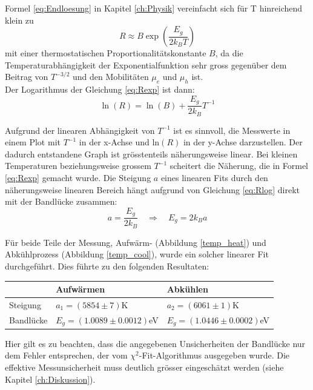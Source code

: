 \documentclass[a4paper,parskip,11pt, DIV12]{scrreprt}
\begin{document}
Formel \ref{eq:Endloesung} in Kapitel \ref{ch:Physik} vereinfacht sich für T hinreichend klein zu
\begin{equation}
\label{eq:Rexp}
R \approx B \exp \left(\frac{E_g}{2 k_B T}\right)
\end{equation}
mit einer thermostatischen Proportionalitätskonstante $B$, da die Temperaturabhängigkeit der Exponentialfunktion sehr gross gegenüber dem Beitrag von $T^{-3/2}$ und den Mobilitäten $\mu_e$ und $\mu_h$ ist.
\\
Der Logarithmus der Gleichung \ref{eq:Rexp} ist dann:
\begin{equation}
\label{eq:Rlog}
\ln(R) = \ln (B) + \frac{E_g}{2 k_B} T^{-1}
\end{equation}

Aufgrund der linearen Abhängigkeit von $T^{-1}$ ist es sinnvoll, die Messwerte in einem Plot mit $T^{-1}$ in der x-Achse und ln$(R)$ in der y-Achse darzustellen. Der dadurch entstandene Graph ist grösstenteils näherungsweise linear. Bei kleinen Temperaturen beziehungsweise grossem $T^{-1}$ scheitert die Näherung, die in Formel \ref{eq:Rexp} gemacht wurde. Die Steigung $a$ eines linearen Fits durch den näherungsweise linearen Bereich hängt aufgrund von Gleichung \ref{eq:Rlog} direkt mit der Bandlücke zusammen:
\begin{equation}
\label{eq:bandgap}
a = \frac{E_g}{2 k_B} \quad \Rightarrow \quad E_g = 2 k_B a
\end{equation}


Für beide Teile der Messung, Aufwärm- (Abbildung \ref{temp_heat}) und Abkühlprozess (Abbildung \ref{temp_cool}), wurde ein solcher linearer Fit durchgeführt. Dies führte zu den folgenden Resultaten:

%
\begin{center}
\begin{tabular}{lll}
					& Aufwärmen 					& Abkühlen\\
	\hline
	Steigung 			& $a_1 = (5854\pm7)$K			& $a_2 = (6061\pm1)$K\\
	Bandlücke			& $E_{g} = (1.0089\pm0.0012)$eV	& $E_{g} = (1.0446\pm0.0002)$eV\\
	
%
\end{tabular}
\end{center}
%

Hier gilt es zu beachten, dass die angegebenen Unsicherheiten der Bandlücke nur dem Fehler entsprechen, der vom $\chi^2$-Fit-Algorithmus ausgegeben wurde. Die effektive Messunsicherheit muss deutlich grösser eingeschätzt werden (siehe Kapitel \ref{ch:Diskussion}).
\end{document}

